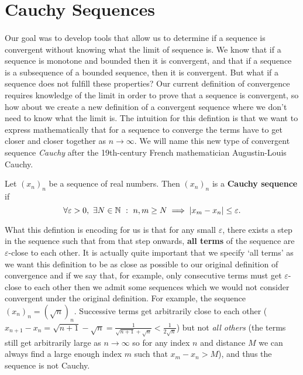 \documentclass[../real_analysis.tex]{subfiles}
\begin{document}
    \section{Cauchy Sequences}
        \paragraph{}
        Our goal was to develop tools that allow us to determine if a sequence is convergent without knowing what the limit of sequence is. We know that if a sequence is monotone and bounded then it is convergent, and that if a sequence is  a subsequence of a bounded sequence, then it is convergent. But what if a sequence does not fulfill these properties? Our current definition of convergence requires knowledge of the limit in order to prove that a sequence is convergent, so how about we create a new definition of a convergent sequence where we don't need to know what the limit is. The intuition for this defintion is that we want to express mathematically that for a sequence to converge the terms have to get closer and closer together as $n\to\infty$. We will name this new type of convergent sequence \textit{Cauchy} after the 19th-century French mathematician Augustin-Louis Cauchy.
        \begin{definition}
            Let $(x_n)_n$ be a sequence of real numbers. Then $(x_n)_n$ is a \textbf{Cauchy sequence} if
            \begin{equation*}
                \forall\varepsilon>0,\ \exists N\in\mathbb{N}\ :\ n,m\geq N\implies\abs{x_m-x_n}\leq\varepsilon.
            \end{equation*}
        \end{definition}
        What this defintion is encoding for us is that for any small $\varepsilon$, there exists a step in the sequence such that from that step onwards, \textbf{all terms} of the sequence are $\varepsilon$-close to each other. It is actually quite important that we specify `all terms' as we want this definition to be as close as possible to our original definition of convergence and if we say that, for example, only consecutive terms must get $\varepsilon$-close to each other then we admit some sequences which we would not consider convergent under the original definition. For example, the sequence $(x_n)_n=(\sqrt{n})_n$. Successive terms get arbitrarily close to each other ($x_{n+1}-x_n=\sqrt{n+1}-\sqrt{n}=\frac{1}{\sqrt{n+1}+\sqrt{n}}<\frac{1}{2\sqrt{n}}$) but not \textit{all others} (the terms still get arbitrarily large as $n\to\infty$ so for any index $n$ and distance $M$ we can always find a large enough index $m$ such that $x_m-x_n>M$), and thus the sequence is not Cauchy.
\end{document}
